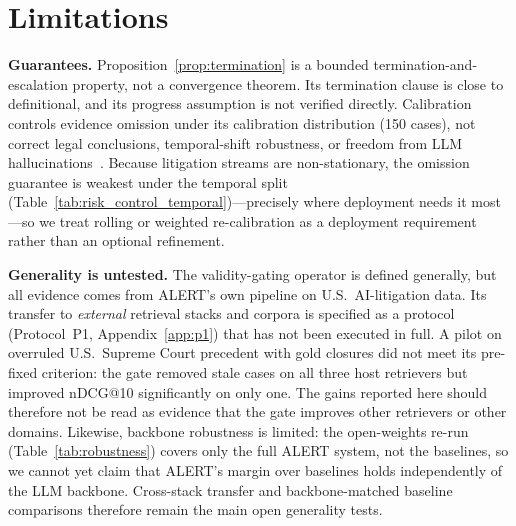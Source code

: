 \section*{Limitations}
\label{sec:limitations}

\textbf{Guarantees.} Proposition~\ref{prop:termination} is a bounded termination-and-escalation property, not a convergence theorem. Its termination clause is close to definitional, and its progress assumption is not verified directly. Calibration controls evidence omission under its calibration distribution (150 cases), not correct legal conclusions, temporal-shift robustness, or freedom from LLM hallucinations~\citep{dahl2024hallucinating}. Because litigation streams are non-stationary, the omission guarantee is weakest under the temporal split (Table~\ref{tab:risk_control_temporal})---precisely where deployment needs it most---so we treat rolling or weighted re-calibration as a deployment requirement rather than an optional refinement.

\textbf{Generality is untested.} The validity-gating operator is defined generally, but all evidence comes from ALERT's own pipeline on U.S.\ AI-litigation data. Its transfer to \emph{external} retrieval stacks and corpora is specified as a protocol (Protocol~P1, Appendix~\ref{app:p1}) that has not been executed in full. A pilot on overruled U.S.\ Supreme Court precedent with gold closures did not meet its pre-fixed criterion: the gate removed stale cases on all three host retrievers but improved nDCG@10 significantly on only one. The gains reported here should therefore not be read as evidence that the gate improves other retrievers or other domains. Likewise, backbone robustness is limited: the open-weights re-run (Table~\ref{tab:robustness}) covers only the full ALERT system, not the baselines, so we cannot yet claim that ALERT's margin over baselines holds independently of the LLM backbone. Cross-stack transfer and backbone-matched baseline comparisons therefore remain the main open generality tests.

